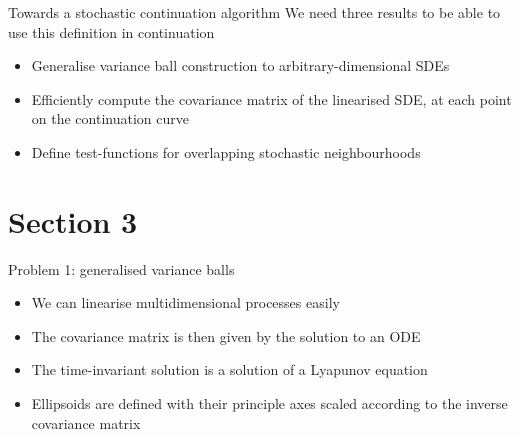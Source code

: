 \documentclass[presentation]{beamer}
\begin{document}
\begin{frame}[label={sec:org0d08f47}]{Towards a stochastic continuation algorithm}
We need three results to be able to use this definition in continuation
\vfill
\begin{itemize}
\item Generalise variance ball construction to arbitrary-dimensional SDEs
\end{itemize}
\vfill
\begin{itemize}
\item Efficiently compute the covariance matrix of the linearised SDE, at each point on the continuation curve
\end{itemize}
\vfill
\begin{itemize}
\item Define test-functions for overlapping stochastic neighbourhoods
\end{itemize}
\end{frame}

\section{Section 3}
\label{sec:org0c9ab21}
\begin{frame}[label={sec:org739cc79}]{Problem 1: generalised variance balls}
\begin{itemize}
\item We can linearise multidimensional processes easily
\end{itemize}
\vfill
\begin{itemize}
\item The covariance matrix is then given by the solution to an ODE
\end{itemize}
\vfill
\begin{itemize}
\item The time-invariant solution is a solution of a Lyapunov equation
\end{itemize}
\vfill
\begin{itemize}
\item Ellipsoids are defined with their principle axes scaled according to the inverse covariance matrix
\end{itemize}
\end{frame}
\end{document}
